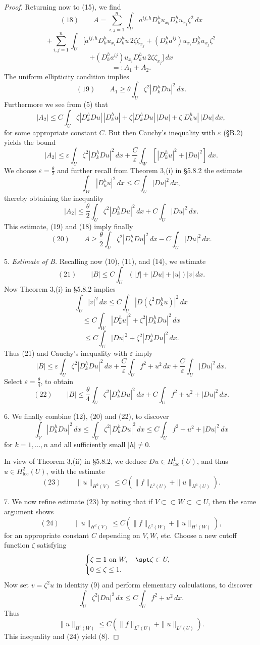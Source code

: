 \begin{proof}
Returning now to (15), we find
$$(18) \qquad A = \sum_{i,j=1}^n \int_U a^{ij,h}D_k^hu_{x_i}D_k^hu_{x_j}\zeta^2\,dx$$
$$+ \sum_{i,j=1}^n \int_U [a^{ij,h}D_k^hu_{x_i}D_k^hu\,2\zeta\zeta_{x_j} + (D_k^ha^{ij})u_{x_i}D_k^hu_{x_j}\zeta^2$$
$$+ (D_k^ha^{ij})u_{x_i}D_k^hu\,2\zeta\zeta_{x_j}]\,dx$$
$$=: A_1 + A_2.$$
The uniform ellipticity condition implies
$$(19) \qquad A_1 \geq \theta\int_U \zeta^2|D_k^hDu|^2\,dx.$$
Furthermore we see from (5) that
$$|A_2| \leq C\int_U \zeta|D_k^hDu|\,|D_k^hu| + \zeta|D_k^hDu|\,|Du| + \zeta|D_k^hu|\,|Du|\,dx,$$
for some appropriate constant $C$. But then Cauchy's inequality with $\varepsilon$ (\S B.2) yields the bound
$$|A_2| \leq \varepsilon\int_U \zeta^2|D_k^hDu|^2\,dx + \frac C\varepsilon\int_W[|D_k^hu|^2+|Du|^2]\,dx.$$
We choose $\varepsilon = \frac\theta2$ and further recall from Theorem 3,(i) in \S5.8.2 the estimate
$$\int_W|D_k^hu|^2\,dx \leq C\int_U|Du|^2\,dx,$$
thereby obtaining the inequality
$$|A_2| \leq \frac\theta2\int_U \zeta^2|D_k^hDu|^2\,dx + C\int_U|Du|^2\,dx.$$
This estimate, (19) and (18) imply finally
$$(20) \qquad A \geq \frac\theta2\int_U \zeta^2|D_k^hDu|^2\,dx - C\int_U|Du|^2\,dx.$$

5. \textit{Estimate of B.} Recalling now (10), (11), and (14), we estimate
$$(21) \qquad |B| \leq C\int_U (|f|+|Du|+|u|)|v|\,dx.$$
Now Theorem 3,(i) in \S5.8.2 implies
$$\int_U|v|^2\,dx \leq C\int_U|D(\zeta^2D_k^hu)|^2\,dx$$
$$\leq C\int_W|D_k^hu|^2 + \zeta^2|D_k^hDu|^2\,dx$$
$$\leq C\int_U|Du|^2 + \zeta^2|D_k^hDu|^2\,dx.$$
Thus (21) and Cauchy's inequality with $\varepsilon$ imply
$$|B| \leq \varepsilon\int_U \zeta^2|D_k^hDu|^2\,dx + \frac C\varepsilon\int_U f^2+u^2\,dx + \frac C\varepsilon\int_U|Du|^2\,dx.$$
Select $\varepsilon = \frac\theta4$, to obtain
$$(22) \qquad |B| \leq \frac\theta4\int_U \zeta^2|D_k^hDu|^2\,dx + C\int_U f^2+u^2+|Du|^2\,dx.$$

6. We finally combine (12), (20) and (22), to discover
$$\int_V |D_k^hDu|^2\,dx \leq \int_U \zeta^2|D_k^hDu|^2\,dx \leq C\int_U f^2+u^2+|Du|^2\,dx$$
for $k=1,\ldots,n$ and all sufficiently small $|h| \neq 0$.

In view of Theorem 3,(ii) in \S5.8.2, we deduce $Du \in H^1_{\text{loc}}(U)$, and thus $u \in H^2_{\text{loc}}(U)$, with the estimate
$$(23) \qquad \|u\|_{H^2(V)} \leq C(\|f\|_{L^2(U)} + \|u\|_{H^1(U)}).$$

7. We now refine estimate (23) by noting that if $V \subset\subset W \subset\subset U$, then the same argument shows
$$(24) \qquad \|u\|_{H^2(V)} \leq C(\|f\|_{L^2(W)} + \|u\|_{H^1(W)}),$$
for an appropriate constant $C$ depending on $V, W$, etc. Choose a new cutoff function $\zeta$ satisfying
$$\begin{cases} \zeta \equiv 1 \text{ on } W, \quad \spt \zeta \subset U, \\ 0 \leq \zeta \leq 1. \end{cases}$$
Now set $v = \zeta^2u$ in identity (9) and perform elementary calculations, to discover
$$\int_U \zeta^2|Du|^2\,dx \leq C\int_U f^2+u^2\,dx.$$
Thus
$$\|u\|_{H^1(W)} \leq C(\|f\|_{L^2(U)}+\|u\|_{L^2(U)}).$$
This inequality and (24) yield (8).
\end{proof}

